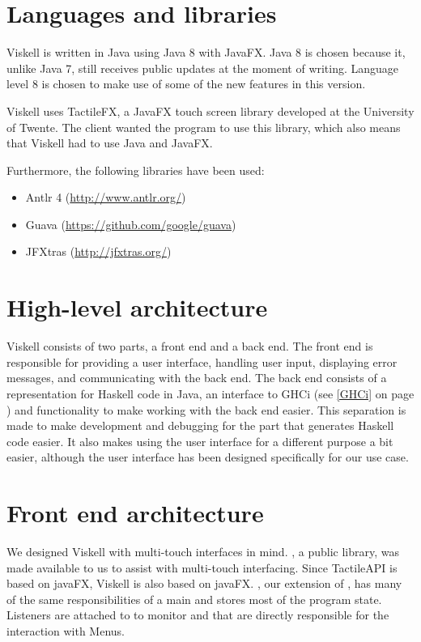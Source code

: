 \section{Languages and libraries}
Viskell is written in Java using Java 8 with JavaFX. 
Java 8 is chosen because it, unlike Java 7, still receives public updates at the moment of writing.
Language level 8 is chosen to make use of some of the new features in this version.

Viskell uses TactileFX, a JavaFX touch screen library developed at the University of Twente.
The client wanted the program to use this library, which also means that Viskell had to use Java and JavaFX.

Furthermore, the following libraries have been used:

\begin{itemize}
	\item Antlr 4 (\url{http://www.antlr.org/})
	\item Guava (\url{https://github.com/google/guava})
	\item JFXtras (\url{http://jfxtras.org/})
\end{itemize}

\section{High-level architecture}
Viskell consists of two parts, a front end and a back end.  
The front end is responsible for providing a user interface, handling user input, displaying error messages, and communicating with the back end.
The back end consists of a representation for Haskell code in Java, an interface to GHCi (see \ref{GHCi} on page \pageref{GHCi}) and functionality to make working with the back end easier.
This separation is made to make development and debugging for the part that generates Haskell code easier.
It also makes using the user interface for a different purpose a bit easier, although the user interface has been designed specifically for our use case.

\section{Front end architecture}
We designed Viskell with multi-touch interfaces in mind. , a public library, was made available to us to assist with multi-touch interfacing. Since TactileAPI is based on javaFX, Viskell is also based on javaFX. , our extension of , has many of the same responsibilities of a main  and stores most of the program state.
Listeners are attached to  to monitor  and  that are directly responsible for the interaction with Menus.

